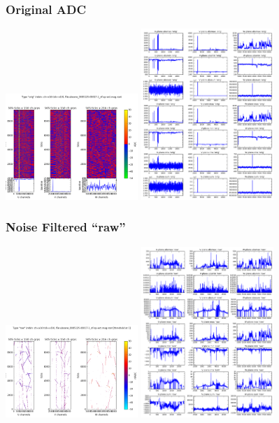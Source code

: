 \documentclass[xcolor=dvipsnames]{beamer}
\begin{document}
\begin{frame}[fragile]
  \frametitle{Original ADC}
  \includegraphics[width=5cm]{figures/uboone_0005125-00017-1_nf-sp-wct-orig_thumb.png}%
  \includegraphics[width=5cm]{figures/uboone_0005125-00017-1_nf-sp-wct-orig_reduc.png}
\end{frame}

\begin{frame}[fragile]
  \frametitle{Noise Filtered ``raw''}
  \includegraphics[width=5cm]{figures/uboone_0005125-00017-1_nf-sp-wct-raw_thumb.png}%
  \includegraphics[width=5cm]{figures/uboone_0005125-00017-1_nf-sp-wct-raw_reduc.png}
\end{frame}
\end{document}
